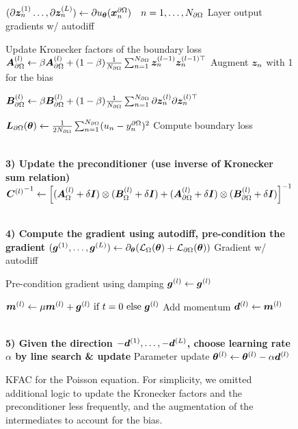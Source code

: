 \begin{figure}
\begin{algorithmic}
  \State $(\partial{\bm{z}}_n^{(1)}\dots, \partial{\bm{z}}_n^{(L)}) \gets \partial u_{{\bm{\theta}}}({\bm{x}}_n^{\partial\Omega})\quad n=1, \dots, N_{\partial\Omega}$ \Comment Layer output gradients w/ autodiff

   \Comment Update Kronecker factors of the boundary loss
  \State ${\bm{A}}_{\partial\Omega}^{(l)} \gets \beta {\bm{A}}_{\partial\Omega}^{(l)} + (1-\beta) \frac1{N_{\partial\Omega}} \sum_{n=1}^{N_{\partial\Omega}} {\bm{z}}_n^{(l-1)} {\bm{z}}_n^{(l-1)\top}$ \Comment Augment ${\bm{z}}_n$ with 1 for the bias

  \State ${\bm{B}}_{\partial\Omega}^{(l)} \gets \beta {\bm{B}}_{\partial\Omega}^{(l)} + (1-\beta) \frac1{N_{\partial\Omega}} \sum_{n=1}^{N_{\partial\Omega}} \partial{\bm{z}}_n^{(l)} \partial{\bm{z}}_n^{(l)\top}$
  \EndFor

  \State ${\bm{L}}_{\partial\Omega}({\bm{\theta}}) \gets \frac{1}{2 N_{\partial\Omega}}\sum_{n=1}^{N_{\partial\Omega}} (u_n - y^{\partial \Omega}_n)^2$ \Comment Compute boundary loss

  \\
  \State \textbf{3) Update the preconditioner (use inverse of Kronecker sum relation)}
  \State $ {{\bm{C}}^{(l)}}^{-1} \gets \left[({\bm{A}}_{\Omega}^{(l)} + \delta {\bm{I}}) \otimes ({\bm{B}}_{\Omega}^{(l)} + \delta {\bm{I}}) + ({\bm{A}}_{\partial\Omega}^{(l)} + \delta {\bm{I}}) \otimes ({\bm{B}}_{\partial\Omega}^{(l)} + \delta {\bm{I}})  \right]^{-1}$

  \\
  \State \textbf{4) Compute the gradient using autodiff, pre-condition the gradient}
  \State $({\bm{g}}^{(1)}, \dots, {\bm{g}}^{(L)}) \gets \partial_{{\bm{\theta}}} ( {\mathcal{L}}_{\Omega}({\bm{\theta}}) + {\mathcal{L}}_{\partial\Omega}({\bm{\theta}}))$ \Comment Gradient w/ autodiff

  \Comment Pre-condition gradient using damping
  \State ${\bm{g}}^{(l)} \gets  {\bm{g}}^{(l)}$

  \State ${\bm{m}}^{(l)} \gets \mu {\bm{m}}^{(l)} + {\bm{g}}^{(l)} \text{ if $t=0$ else } {\bm{g}}^{(l)}$ \Comment Add momentum
  \State ${\bm{d}}^{(l)} \gets {\bm{m}}^{(l)}$
  \EndFor

  \\
  \State \textbf{5) Given the direction $-{\bm{d}}^{(1)}, \dots, -{\bm{d}}^{(L)}$, choose learning rate $\alpha$ by line search \& update}
   \Comment Parameter update
  \State ${\bm{\theta}}^{(l)} \gets {\bm{\theta}}^{(l)} - \alpha {\bm{d}}^{(l)}$
  \EndFor
  \EndFor
\end{algorithmic}
\caption{KFAC for the Poisson equation.
  For simplicity, we omitted additional logic to update the Kronecker factors and the preconditioner less frequently, and the augmentation of the intermediates to account for the bias.}
\end{figure}
